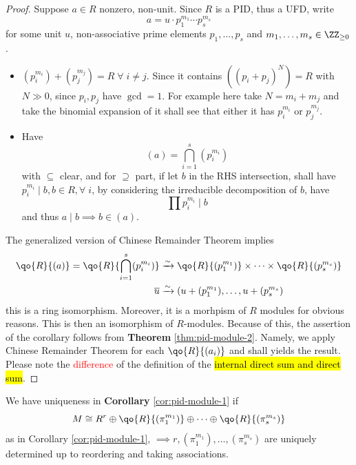 \begin{proof}
	Suppose \( a\in R \) nonzero, non-unit. Since \( R \) is a PID, thus a UFD, write
	\[
		a = u \cdot p_1^{m_1}\cdots p_s^{m_s}
	\]
	for some unit \( u \), non-associative prime elements \( p_1,\ldots,p_s \) and \( m_1,\ldots,m_s
	\in \ZZ_{\geq 0} \).

	\begin{note}
		\leavevmode
		\begin{itemize}
			\item \( (p_i^{m_i}) + (p_j^{m_j}) = R \; \forall \; i \ne j \). Since it contains \( ((p_i +
			      p_j)^N) = R \) with \( N \gg 0 \), since \( p_i, p_j \) have \( \gcd = 1 \). For example
			      here take \( N = m_i + m_j \) and take the binomial expansion of it shall see that
			      either it has \( p_i^{m_i} \) or \( p_j^{m_j} \).
			\item Have
			      \[
				      (a) = \bigcap_{i=1}^s (p_i^{m_i})
			      \]
			      with \( \subseteq \) clear, and for \( \supseteq \) part, if let \( b \) in the RHS intersection, shall have \( p_i^{m_i} \mid b, b\in
			      R, \forall \; i \), by considering the irreducible decomposition of \( b \), have
			      \[
				      \prod p_i^{m_i} \mid b
			      \]
			      and thus \( a\mid b \implies b \in (a) \).
		\end{itemize}
	\end{note}
	The generalized version of Chinese Remainder Theorem implies
	\[
		\begin{aligned}
			\qo{R}{(a)} = \qo{R}{\bigcap_{i=1}^s (p_i^{m_i})} & \xrightarrow{\sim} \qo{R}{(p_1^{m_1})} \times
			\cdots \times \qo{R}{(p_s^{m_s})}                                                                 \\
			\overline{u}                                      & \xrightarrow{\sim} (u+ (p_1^{m_1}),\ldots,
			u + (p_s^{m_s})
		\end{aligned}
	\]
	this is a ring isomorphism. Moreover, it is a morhpism of \( R \) modules for obvious reasons.
	This is then an isomorphism of \( R \)-modules. Because of this, the assertion of the corollary
	follows from \textbf{Theorem} \ref{thm:pid-module-2}. Namely, we apply Chinese
	Remainder Theorem for each \( \qo{R}{(a_i)} \) and shall yields the result. Please note the
	\textcolor{red}{difference} of the definition of the \hl{internal direct sum and direct sum}.
\end{proof}

\begin{remark}
	We have uniqueness in \textbf{Corollary} \ref{cor:pid-module-1} if
	\[
		M \cong R^r \oplus \qo{R}{(\pi_1^{m_1})} \oplus \cdots \oplus \qo{R}{(\pi_s^{m_s})}
	\]
	as in Corollary \ref{cor:pid-module-1}, \( \implies r, (\pi_1^{m_1}),\ldots,
	(\pi_s^{m_s}) \) are uniquely determined up to reordering and taking associations.
\end{remark}

